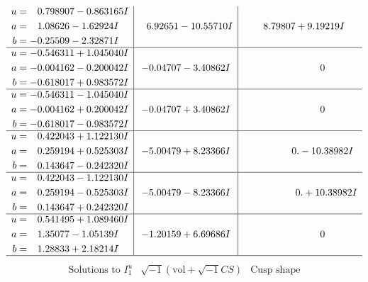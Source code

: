 \documentclass[1p]{elsarticle_modified}
\theoremstyle{definition}
\newcommand{\I}{\sqrt{-1}}
\begin{document}
$$\begin{array}{c|c|c}
\begin{aligned}
u &= \phantom{-}0.798907 - 0.863165 I \\
a &= \phantom{-}1.08626 - 1.62924 I \\
b &= -0.25509 - 2.32871 I\end{aligned}
 & \phantom{-}6.92651 - 10.55710 I & \phantom{-}8.79807 + 9.19219 I \\ \hline\begin{aligned}
u &= -0.546311 + 1.045040 I \\
a &= -0.004162 - 0.200042 I \\
b &= -0.618017 + 0.983572 I\end{aligned}
 & -0.04707 - 3.40862 I & \phantom{-0.000000 } 0 \\ \hline\begin{aligned}
u &= -0.546311 - 1.045040 I \\
a &= -0.004162 + 0.200042 I \\
b &= -0.618017 - 0.983572 I\end{aligned}
 & -0.04707 + 3.40862 I & \phantom{-0.000000 } 0 \\ \hline\begin{aligned}
u &= \phantom{-}0.422043 + 1.122130 I \\
a &= \phantom{-}0.259194 + 0.525303 I \\
b &= \phantom{-}0.143647 - 0.242320 I\end{aligned}
 & -5.00479 + 8.23366 I & \phantom{-0.000000 } 0. - 10.38982 I \\ \hline\begin{aligned}
u &= \phantom{-}0.422043 - 1.122130 I \\
a &= \phantom{-}0.259194 - 0.525303 I \\
b &= \phantom{-}0.143647 + 0.242320 I\end{aligned}
 & -5.00479 - 8.23366 I & \phantom{-0.000000 -}0. + 10.38982 I \\ \hline\begin{aligned}
u &= \phantom{-}0.541495 + 1.089460 I \\
a &= \phantom{-}1.35077 - 1.05139 I \\
b &= \phantom{-}1.28833 + 2.18214 I\end{aligned}
 & -1.20159 + 6.69686 I & \phantom{-0.000000 } 0\\
 \hline 
 \end{array}$$\newpage$$\begin{array}{c|c|c}  
\text{Solutions to }I^u_{1}& \I (\text{vol} + \sqrt{-1}CS) & \text{Cusp shape}\\

\end{array}$$
\end{document}
